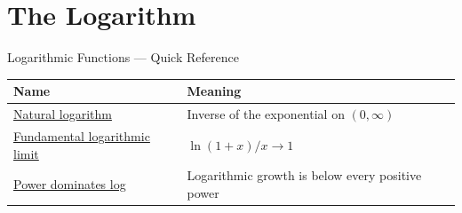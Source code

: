 \section{The Logarithm}

\begin{toolkitbox}{Logarithmic Functions --- Quick Reference}
\small
\begin{tabular}{l l}
\toprule
\textbf{Name} & \textbf{Meaning} \\
\midrule
\hyperref[def:natural-logarithm]{Natural logarithm} & Inverse of the exponential on \((0,\infty)\) \\
\hyperref[prop:limit-logarithm-fundamental]{Fundamental logarithmic limit} & \(\ln(1+x)/x\to 1\) \\
\hyperref[prop:power-dominates-log]{Power dominates log} & Logarithmic growth is below every positive power \\
\bottomrule
\end{tabular}
\end{toolkitbox}


